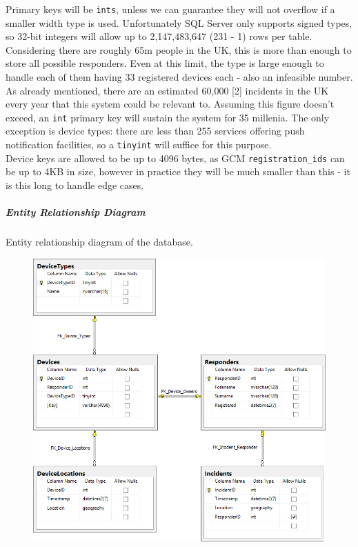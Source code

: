 \documentclass{article}
\begin{document}
	Primary keys will be \texttt{\color{OliveGreen}ints}, unless we can guarantee they will not overflow if a smaller width type is used. Unfortunately SQL Server only supports signed types, so 32-bit integers will allow up to 2,147,483,647 (231 - 1) rows per table. Considering there are roughly 65m people in the UK, this is more than enough to store all possible responders. Even at this limit, the type is large enough to handle each of them having 33 registered devices each - also an infeasible number. As already mentioned, there are an estimated 60,000 [2] incidents in the UK every year that this system could be relevant to. Assuming this figure doesn’t exceed, an \texttt{\color{OliveGreen}int} primary key will sustain the system for 35 millenia. The only exception is device types: there are less than 255 services offering push notification facilities, so a \texttt{\color{OliveGreen}tinyint} will suffice for this purpose.\\

Device keys are allowed to be up to 4096 bytes, as GCM \texttt{\color{OliveGreen}registration\_ids} can be up to 4KB in size, however in practice they will be much smaller than this - it is this long to handle edge cases.\\

\pagebreak
\subparagraph{Entity Relationship Diagram}
Entity relationship diagram of the database.
	\begin{figure}[H]
		\centering
		\includegraphics[width=1.1\textwidth]{"Iteration1/cpr-database-0"}
	\end{figure}
\end{document}
